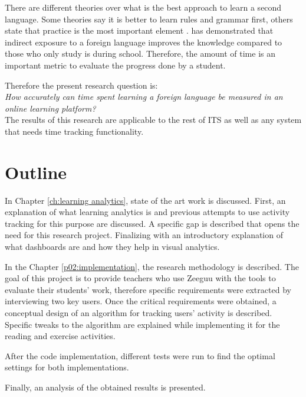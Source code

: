 There are different theories over what is the best approach to learn a second language. Some theories say it is better to learn rules and grammar first, others state that practice is the most important element \cite{Ellis1993}. \citeauthor{Kuppens2010} has demonstrated that indirect exposure to a foreign language improves the knowledge compared to those who only study is during school. Therefore, the amount of time is an important metric to evaluate the progress done by a student.

Therefore the present research question is: \\

\emph{How accurately can time spent learning a foreign language be measured in an online learning platform?}\\

The results of this research are applicable to the rest of ITS as well as any system that needs time tracking functionality.

\section{Outline}

In Chapter \ref{ch:learning analytics}, state of the art work is discussed. First, an explanation of what learning analytics is and previous attempts to use activity tracking for this purpose are discussed. A specific gap is described that opens the need for this research project. Finalizing with an introductory explanation of what dashboards are and how they help in visual analytics.

In the Chapter \ref{p02:implementation}, the research methodology is described. The goal of this project is to provide teachers who use Zeeguu with the tools to evaluate their students' work, therefore specific requirements were extracted by interviewing two key users. Once the critical requirements were obtained, a conceptual design of an algorithm for tracking users' activity is described. Specific tweaks to the algorithm are explained while implementing it for the reading and exercise activities.

After the code implementation, different tests were run to find the optimal settings for both implementations.

Finally, an analysis of the obtained results is presented.


